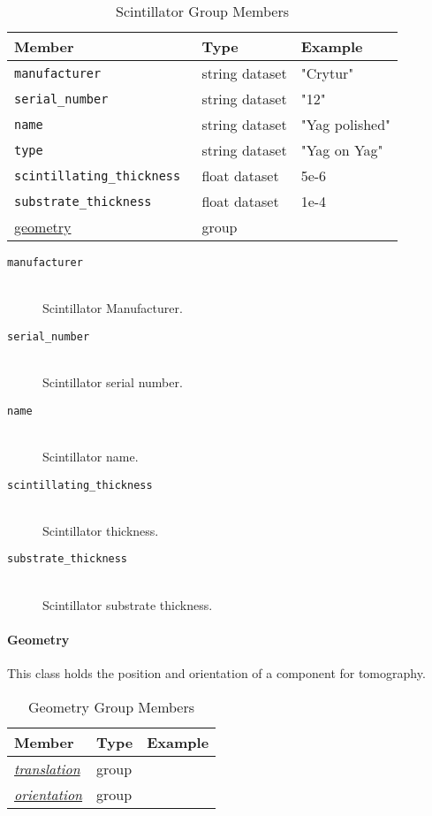 \begin{table}[h!]\sffamily \footnotesize
\caption{Scintillator Group Members}
\centering
{}
\begin{tabular}{l l l}
\toprule
\bfseries Member     & \bfseries Type & \bfseries Example \\
\midrule
\tt{manufacturer} & string dataset & "Crytur" \\
\tt{serial\_number} & string dataset &  "12" \\   
\tt{name} & string dataset & "Yag polished" \\ 
\tt{type} & string dataset & "Yag on Yag" \\  
\tt{scintillating\_thickness} & float dataset &  5e-6 \\  
\tt{substrate\_thickness} & float dataset &   1e-4\\  
\hyperref[tomo:geometry]{geometry} &  group & \\
\bottomrule
\end{tabular}
\end{table}

\begin{description}
\item[\tt{manufacturer}] \hfill \\
{Scintillator Manufacturer.}

\item[\tt{serial\_number}] \hfill \\
{Scintillator serial number.}

\item[\tt{name}] \hfill \\
{Scintillator name.}

\item[\tt{scintillating\_thickness}] \hfill \\
{Scintillator thickness.}

\item[\tt{substrate\_thickness}] \hfill \\
{Scintillator substrate thickness.}
\end{description}

\paragraph{Geometry}
\label{tomo:geometry}

This class holds the position and orientation of a component for tomography.

\begin{table}[h!]\sffamily \footnotesize
\centering
\caption{Geometry Group Members}
\begin{tabular}{l l l}
\toprule
\bfseries Member     & \bfseries Type & \bfseries Example \\
\midrule

\hyperref[tomo:translation]{\emph{translation}} & group &  \\
\hyperref[tomo:orientation]{\emph{orientation}} & group & \\

\bottomrule
\end{tabular}
\end{table}

